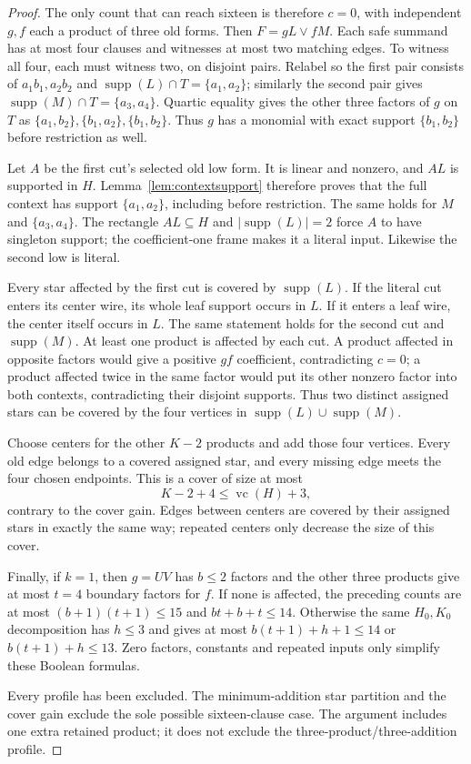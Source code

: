 \documentclass[11pt]{article}
\newcommand{\supp}{\operatorname{supp}}
\newcommand{\vc}{\operatorname{vc}}
\theoremstyle{definition}
\theoremstyle{remark}
\begin{document}
\begin{proof}
The only count that can reach sixteen is therefore $c=0$, with independent $g,f$ each a product of three old forms. Then $F=gL\vee fM$. Each safe summand has at most four clauses and witnesses at most two matching edges. To witness all four, each must witness two, on disjoint pairs. Relabel so the first pair consists of $a_1b_1,a_2b_2$ and $\supp(L)\cap T=\{a_1,a_2\}$; similarly the second pair gives $\supp(M)\cap T=\{a_3,a_4\}$. Quartic equality gives the other three factors of $g$ on $T$ as $\{a_1,b_2\},\{b_1,a_2\},\{b_1,b_2\}$. Thus $g$ has a monomial with exact support $\{b_1,b_2\}$ before restriction as well.

Let $A$ be the first cut's selected old low form. It is linear and nonzero, and $AL$ is supported in $H$. Lemma~\ref{lem:contextsupport} therefore proves that the full context has support $\{a_1,a_2\}$, including before restriction. The same holds for $M$ and $\{a_3,a_4\}$. The rectangle $AL\subseteq H$ and $|\supp(L)|=2$ force $A$ to have singleton support; the coefficient-one frame makes it a literal input. Likewise the second low is literal.

Every star affected by the first cut is covered by $\supp(L)$. If the literal cut enters its center wire, its whole leaf support occurs in $L$. If it enters a leaf wire, the center itself occurs in $L$. The same statement holds for the second cut and $\supp(M)$. At least one product is affected by each cut. A product affected in opposite factors would give a positive $gf$ coefficient, contradicting $c=0$; a product affected twice in the same factor would put its other nonzero factor into both contexts, contradicting their disjoint supports. Thus two distinct assigned stars can be covered by the four vertices in $\supp(L)\cup\supp(M)$.

Choose centers for the other $K-2$ products and add those four vertices. Every old edge belongs to a covered assigned star, and every missing edge meets the four chosen endpoints. This is a cover of size at most
\[
 K-2+4\le\vc(H)+3,
\]
contrary to the cover gain. Edges between centers are covered by their assigned stars in exactly the same way; repeated centers only decrease the size of this cover.

Finally, if $k=1$, then $g=UV$ has $b\le2$ factors and the other three products give at most $t=4$ boundary factors for $f$. If none is affected, the preceding counts are at most $(b+1)(t+1)\le15$ and $bt+b+t\le14$. Otherwise the same $H_0,K_0$ decomposition has $h\le3$ and gives at most $b(t+1)+h+1\le14$ or $b(t+1)+h\le13$. Zero factors, constants and repeated inputs only simplify these Boolean formulas.

Every profile has been excluded. The minimum-addition star partition and the cover gain exclude the sole possible sixteen-clause case. The argument includes one extra retained product; it does not exclude the three-product/three-addition profile.
\end{proof}
\end{document}
